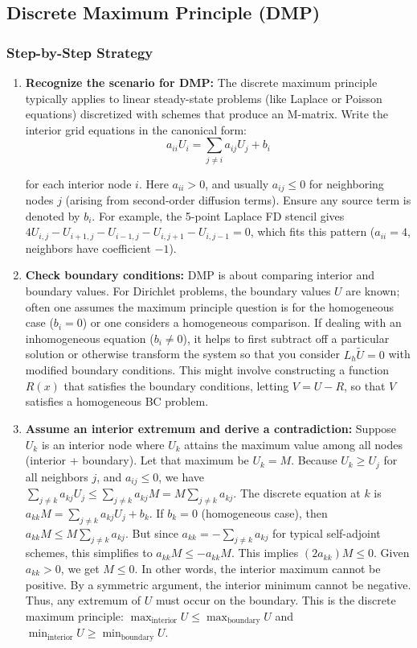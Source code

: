 \documentclass[a4paper,11pt]{article}
\begin{document}
\subsection{Discrete Maximum Principle (DMP)}

\subsubsection{Step-by-Step Strategy}

\begin{enumerate}
    \item \textbf{Recognize the scenario for DMP:} The discrete maximum principle typically applies to linear steady-state problems (like Laplace or Poisson equations) discretized with schemes that produce an M-matrix. Write the interior grid equations in the canonical form:
          \begin{equation}
              a_{ii}U_i = \sum_{j \neq i} a_{ij}U_j + b_i
          \end{equation}

          for each interior node $i$. Here $a_{ii}>0$, and usually $a_{ij}\le 0$ for neighboring nodes $j$ (arising from second-order diffusion terms). Ensure any source term is denoted by $b_i$. For example, the 5-point Laplace FD stencil gives $4U_{i,j} - U_{i+1,j}-U_{i-1,j}-U_{i,j+1}-U_{i,j-1}=0$, which fits this pattern ($a_{ii}=4$, neighbors have coefficient $-1$).

    \item \textbf{Check boundary conditions:} DMP is about comparing interior and boundary values. For Dirichlet problems, the boundary values $U$ are known; often one assumes the maximum principle question is for the homogeneous case ($b_i=0$) or one considers a homogeneous comparison. If dealing with an inhomogeneous equation ($b_i \neq 0$), it helps to first subtract off a particular solution or otherwise transform the system so that you consider $L_h \tilde U = 0$ with modified boundary conditions. This might involve constructing a function $R(x)$ that satisfies the boundary conditions, letting $V = U - R$, so that $V$ satisfies a homogeneous BC problem.

    \item \textbf{Assume an interior extremum and derive a contradiction:} Suppose $U_k$ is an interior node where $U_k$ attains the maximum value among all nodes (interior + boundary). Let that maximum be $U_k = M$. Because $U_k \ge U_j$ for all neighbors $j$, and $a_{ij}\le 0$, we have $\sum_{j \ne k} a_{kj}U_j \le \sum_{j \ne k} a_{kj} M = M\sum_{j\ne k}a_{kj}$. The discrete equation at $k$ is $a_{kk} M = \sum_{j\ne k} a_{kj} U_j + b_k$. If $b_k=0$ (homogeneous case), then $a_{kk} M \le M \sum_{j\ne k}a_{kj}$. But since $a_{kk} = -\sum_{j\ne k} a_{kj}$ for typical self-adjoint schemes, this simplifies to $a_{kk} M \le -a_{kk} M$. This implies $(2a_{kk}) M \le 0$. Given $a_{kk}>0$, we get $M \le 0$. In other words, the interior maximum cannot be positive. By a symmetric argument, the interior minimum cannot be negative. Thus, any extremum of $U$ must occur on the boundary. This is the discrete maximum principle: $\max_{\text{interior}} U \le \max_{\text{boundary}} U$ and $\min_{\text{interior}} U \ge \min_{\text{boundary}} U$.


\end{enumerate}
\end{document}
